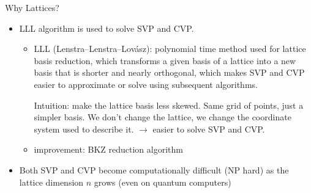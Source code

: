 \documentclass{beamer}
\theoremstyle{customstyle}
\newtheorem{defn}[thm]{Definition}
\newcommand{\Zz}{\mathbb{Z}}
\begin{document}
\begin{frame}{Why Lattices?}
  \begin{itemize}
    \item LLL algorithm is used to solve SVP and CVP.
    \begin{itemize}
      \item LLL (Lenstra–Lenstra–Lovász): polynomial time method used for lattice basis reduction, which transforms a given basis of a lattice into a new basis that is shorter and nearly orthogonal, which makes SVP and CVP easier to approximate or solve using subsequent algorithms.
      \begin{tcolorbox}[colback=gray!15, colframe=gray!15] Intuition:
	make the lattice basis less skewed. Same grid of points, just a simpler
	basis. We don't change the lattice, we change the coordinate system used to
	describe it. $\longrightarrow$ easier to solve SVP and CVP.
      \end{tcolorbox}
    \item improvement: BKZ reduction algorithm
    \end{itemize}

      \item Both SVP and CVP become computationally difficult (NP hard) as the
	lattice dimension $n$ grows (even on quantum computers)
  \end{itemize}
\end{frame}

\end{document}
